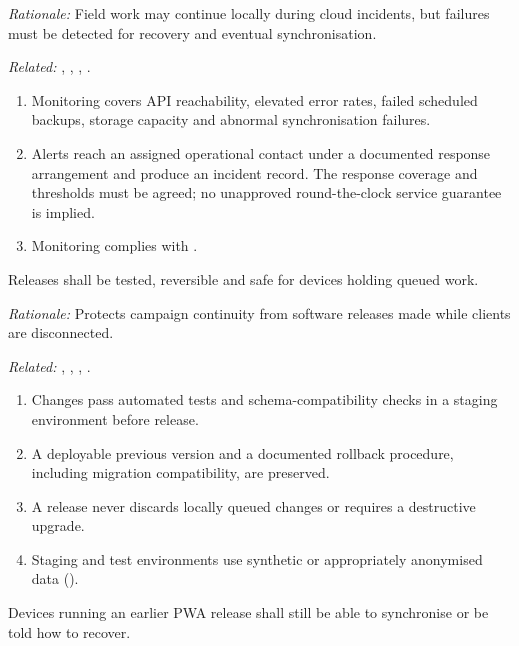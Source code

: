\textit{Rationale:} Field work may continue locally during cloud incidents, but failures must be detected for recovery and eventual synchronisation.

\textit{Related:} \hyperref[fr:004]{}, \hyperref[fr:037]{}, \hyperref[fr:043]{}, \hyperref[fr:048]{}.
\begin{enumerate}[label=(\alph*),leftmargin=*,itemsep=1pt,topsep=3pt]
\item Monitoring covers API reachability, elevated error rates, failed scheduled backups, storage capacity and abnormal synchronisation failures.
\item Alerts reach an assigned operational contact under a documented response arrangement and produce an incident record. The response coverage and thresholds must be agreed; no unapproved round-the-clock service guarantee is implied.
\item Monitoring complies with \hyperref[nfr:PRV-06]{}.
\end{enumerate}

\label{nfr:REL-06}
Releases shall be tested, reversible and safe for devices holding queued work.

\textit{Rationale:} Protects campaign continuity from software releases made while clients are disconnected.

\textit{Related:} \hyperref[fr:003]{}, \hyperref[fr:004]{}, \hyperref[fr:037]{}, \hyperref[fr:045]{}.
\begin{enumerate}[label=(\alph*),leftmargin=*,itemsep=1pt,topsep=3pt]
\item Changes pass automated tests and schema-compatibility checks in a staging environment before release.
\item A deployable previous version and a documented rollback procedure, including migration compatibility, are preserved.
\item A release never discards locally queued changes or requires a destructive upgrade.
\item Staging and test environments use synthetic or appropriately anonymised data (\hyperref[nfr:PRV-02]{}).
\end{enumerate}

\label{nfr:REL-07}
Devices running an earlier PWA release shall still be able to synchronise or be told how to recover.

